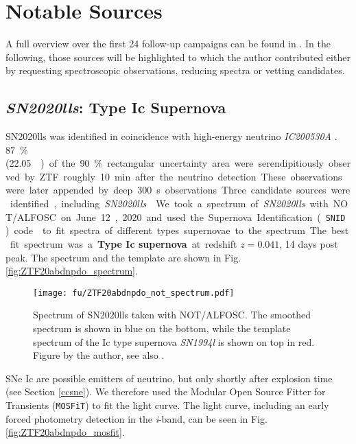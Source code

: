\section{Notable Sources}
A full overview over the first 24 follow-up campaigns can be found in . In the following, those sources will be highlighted to which the author contributed either by requesting spectroscopic observations, reducing spectra or vetting candidates.

\subsection{\emph{SN2020lls}: Type Ic Supernova} \label{SN2020lls}
SN2020lls was identified in coincidence with high-energy neutrino \emph{IC200530A} . \SI{87}{\percent} (\SI{22.05}{\square\deg}) of the \SI{90}{\percent} rectangular uncertainty area were serendipitiously observed by ZTF roughly \SI{10}{\minute} after the neutrino detection. These observations were later appended by deep \SI{300}{\second} observations Three candidate sources were identified, including \emph{SN2020lls} . 

We took a spectrum of \emph{SN2020lls} with NOT/ALFOSC on June 12, 2020 and used the Supernova Identification (\texttt{SNID}) code  to fit spectra of different types supernovae to the spectrum. The best fit spectrum was a \textbf{Type Ic supernova} at redshift $z=0.041$, 14 days post peak. The spectrum and the template are shown in Fig. \ref{fig:ZTF20abdnpdo_spectrum}. 

\begin{figure}[h!]
    \texttt{[image: fu/ZTF20abdnpdo\_not\_spectrum.pdf]}
    \caption[SN2020lls spectrum]{Spectrum of SN2020lls taken with NOT/ALFOSC. The smoothed spectrum is shown in blue on the bottom, while the template spectrum of the Ic type supernova \emph{SN1994l} is shown on top in red. Figure by the author, see also \cite{Stein2023a}.}
\end{figure}
SNe Ic are possible emitters of neutrino, but only shortly after explosion time (see Section \ref{ccsne}). We therefore used the Modular Open Source Fitter for Transients (\texttt{MOSFiT})  to fit the light curve. The light curve, including an early forced photometry detection in the \textit{i}-band, can be seen in Fig. \ref{fig:ZTF20abdnpdo_mosfit}.

